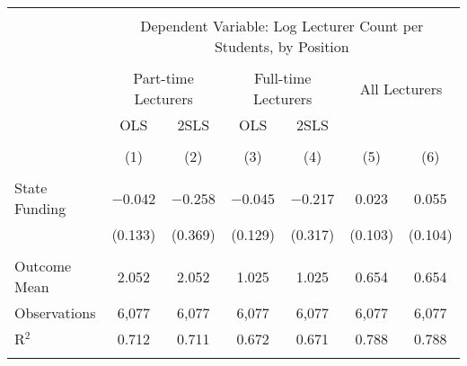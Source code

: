 
\begin{tabular}{@{\extracolsep{5pt}}lcccccc} 
\\[-1.8ex]\hline 
\hline \\[-1.8ex] 
 & \multicolumn{6}{c}{Dependent Variable: Log Lecturer Count per Students, by Position} \\ 
\cline{2-7} 
\\[-1.8ex] & \multicolumn{2}{c}{Part-time Lecturers} & \multicolumn{2}{c}{Full-time Lecturers} & \multicolumn{2}{c}{All Lecturers} \\ 
 & OLS & 2SLS & OLS & 2SLS &  &  \\ 
\\[-1.8ex] & (1) & (2) & (3) & (4) & (5) & (6)\\ 
\hline \\[-1.8ex] 
 State Funding & $-$0.042 & $-$0.258 & $-$0.045 & $-$0.217 & 0.023 & 0.055 \\ 
  & (0.133) & (0.369) & (0.129) & (0.317) & (0.103) & (0.104) \\ 
 \hline \\[-1.8ex] 
Outcome Mean & 2.052 & 2.052 & 1.025 & 1.025 & 0.654 & 0.654 \\ 
Observations & 6,077 & 6,077 & 6,077 & 6,077 & 6,077 & 6,077 \\ 
R$^{2}$ & 0.712 & 0.711 & 0.672 & 0.671 & 0.788 & 0.788 \\ 
\hline 
\hline \\[-1.8ex] 
\end{tabular} 

